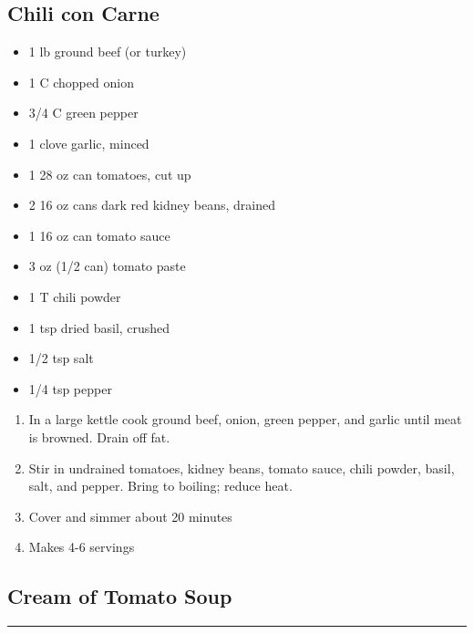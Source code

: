 \documentclass{article}
\begin{document}
\subsection{Chili con Carne} 

\begin{framed}
    \begin{itemize}
        \item 1 lb ground beef (or turkey)
        \item 1 C chopped onion
        \item 3/4 C green pepper
        \item 1 clove garlic, minced
        \item 1 28 oz can tomatoes, cut up
        \item 2 16 oz cans dark red kidney beans, drained
        \item 1 16 oz can tomato sauce
        \item 3 oz (1/2 can) tomato paste
        \item 1 T chili powder
        \item 1 tsp dried basil, crushed
        \item 1/2 tsp salt
        \item 1/4 tsp pepper
    \end{itemize}
\end{framed}

\begin{enumerate}
    \item
        In a large kettle cook ground beef, onion, green pepper, and garlic until meat is browned. Drain off fat.
    \item
        Stir in undrained tomatoes, kidney beans, tomato sauce, chili powder, basil, salt, and pepper. Bring to boiling; reduce heat.
    \item
        Cover and simmer about 20 minutes
    \item
        Makes 4-6 servings
\end{enumerate}
\newpage

\subsection{Cream of Tomato Soup} 
\noindent\rule[0.5ex]{\linewidth}{1pt}
\end{document}
